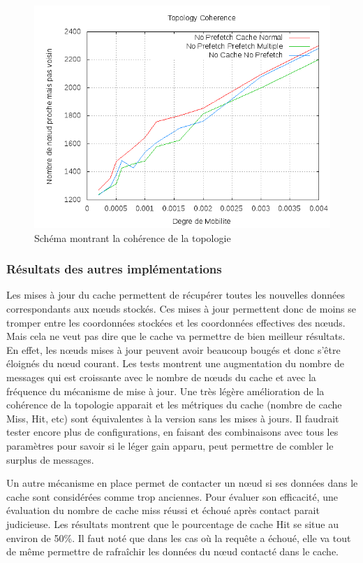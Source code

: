 	\begin{figure}[!h]
        \centering
        \includegraphics[scale=0.5]{../CacheCode/SolipsisPeersim/resultats/Courbes/Courbes_Final_Rapport/Topology_Coherence_Caches.png}
        \caption{Schéma montrant la cohérence de la topologie}
        \label{courbesTopoCohCache:config1}
        \end{figure}

\subsubsection{Résultats des autres implémentations}

Les mises à jour du cache permettent de récupérer toutes les nouvelles données correspondants aux nœuds stockés. Ces mises à jour permettent donc de moins se tromper entre les coordonnées stockées et les coordonnées effectives des nœuds. Mais cela ne veut pas dire que le cache va permettre de bien meilleur résultats. En effet, les nœuds mises à jour peuvent avoir beaucoup bougés et donc s'être éloignés du nœud courant. Les tests montrent une augmentation du nombre de messages qui est croissante avec le nombre de nœuds du cache et avec la fréquence du mécanisme de mise à jour. Une très légère amélioration de la cohérence de la topologie apparait et les métriques du cache (nombre de cache Miss, Hit, etc) sont équivalentes à la version sans les mises à jours. Il faudrait tester encore plus de configurations, en faisant des combinaisons avec tous les paramètres pour savoir si le léger gain apparu, peut permettre de combler le surplus de messages.
\par Un autre mécanisme en place permet de contacter un nœud si ses données dans le cache sont considérées comme trop anciennes. Pour évaluer son efficacité, une évaluation du nombre de cache miss réussi et échoué après contact parait judicieuse. Les résultats montrent que le pourcentage de cache Hit se situe au environ de 50\%. Il faut noté que dans les cas où la requête a échoué, elle va tout de même permettre de rafraîchir les données du nœud contacté dans le cache.


